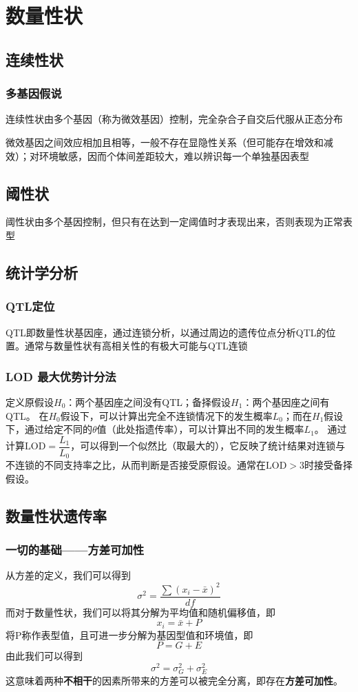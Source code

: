 \documentclass[a4paper, 12pt]{report}
\begin{document}
  \chapter{数量性状}
  \section{连续性状}
  \subsection{多基因假说}
  连续性状由多个基因（称为微效基因）控制，完全杂合子自交后代服从正态分布

  微效基因之间效应相加且相等，一般不存在显隐性关系（但可能存在增效和减效）；对环境敏感，因而个体间差距较大，难以辨识每一个单独基因表型
  \section{阈性状}
  阈性状由多个基因控制，但只有在达到一定阈值时才表现出来，否则表现为正常表型
  \section{统计学分析} 
  \subsection{QTL定位}
  QTL即数量性状基因座，通过连锁分析，以通过周边的遗传位点分析QTL的位置。通常与数量性状有高相关性的有极大可能与QTL连锁
  \subsection{LOD 最大优势计分法}
  定义原假设$H_0$：两个基因座之间没有QTL；备择假设$H_1$：两个基因座之间有QTL。
  在$H_0$假设下，可以计算出完全不连锁情况下的发生概率$L_0$；而在$H_1$假设下，通过给定不同的$\theta$值（此处指遗传率），可以计算出不同的发生概率$L_1$。
  通过计算$\mathrm{LOD} = \dfrac{L_1}{L_0}$，可以得到一个似然比（取最大的），它反映了统计结果对连锁与不连锁的不同支持率之比，从而判断是否接受原假设。通常在$\mathrm{LOD} > 3$时接受备择假设。 
  \section{数量性状遗传率}
  \subsection{一切的基础——方差可加性}
  从方差的定义，我们可以得到$$\sigma^2 = \dfrac{\sum(x_i-\bar{x})^2}{df}$$
  而对于数量性状，我们可以将其分解为平均值和随机偏移值，即$$x_i=\bar{x}+P$$
  将P称作表型值，且可进一步分解为基因型值和环境值，即$$P=G+E$$
  由此我们可以得到$$\sigma^2 = \sigma^2_G + \sigma^2_E$$
  这意味着两种\textbf{不相干}的因素所带来的方差可以被完全分离，即存在\textbf{方差可加性}。
\end{document}
